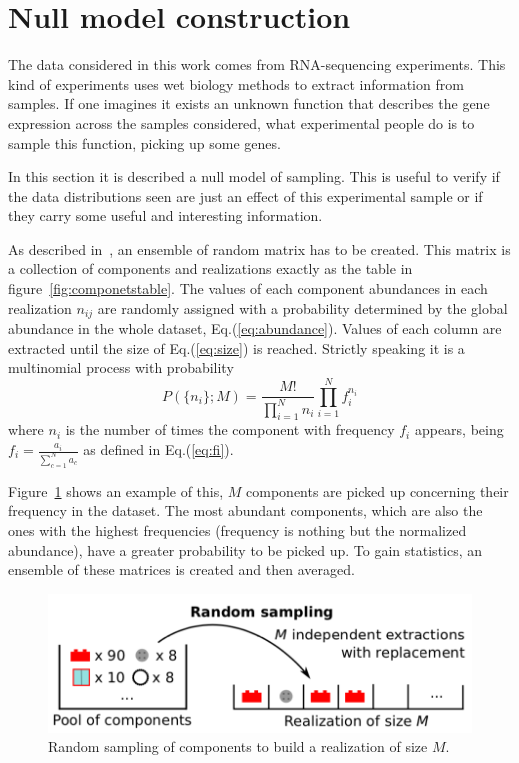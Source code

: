 \section{Null model construction}\label{sec:nullmodel}
The data considered in this work comes from RNA-sequencing experiments. This kind of experiments uses wet biology methods to extract information from samples. If one imagines it exists an unknown function that describes the gene expression across the samples considered, what experimental people do is to sample this function, picking up some genes.

In this section it is described a null model of sampling. This is useful to verify if the data distributions seen are just an effect of this experimental sample or if they carry some useful and interesting information.

As described in~\cite{Mazzolini2018}, an ensemble of random matrix has to be created. This matrix is a collection of components and realizations exactly as the table in figure~\ref{fig:componetstable}. The values of each component abundances in each realization $n_{i j}$ are randomly assigned with a probability determined by the global abundance in the whole dataset, Eq.(\ref{eq:abundance}). Values of each column are extracted until the size of Eq.(\ref{eq:size}) is 
reached. Strictly speaking it is a multinomial process with probability
\begin{equation}
P\left( \{ n_i\} ;M\right) =\frac{M!}{\prod_{i=1}^{N} n_i}\prod_{i=1}^N f_i^{n_i}
\end{equation}
where $n_i$ is the number of times the component with frequency $f_i$ appears, being $f_i=\frac{a_i}{\sum_{c=1}^{N}a_{c}}$ as defined in Eq.(\ref{eq:fi}).

Figure~\ref{fig:structure/randomsampling} shows an example of this, $M$ components are picked up concerning their frequency in the dataset. The most abundant components, which are also the ones with the highest frequencies (frequency is nothing but the normalized abundance), have a greater probability to be picked up. To gain statistics, an ensemble of these matrices is created and then averaged.
\begin{figure}[htb!]
    \centering
    \includegraphics[width=0.8\linewidth]{pictures/structure/randomsampling.png}
    \caption{Random sampling of components to build a realization of size $M$.}
    \label{fig:structure/randomsampling}
\end{figure}

